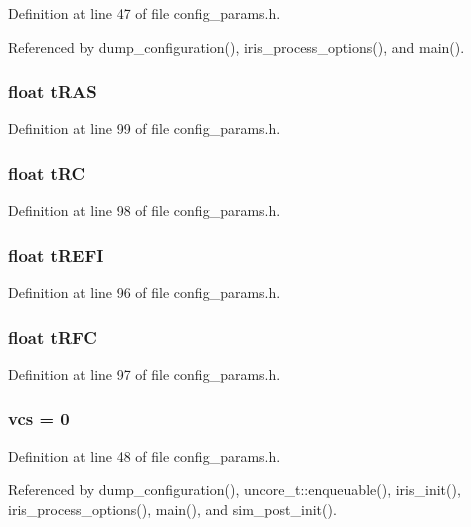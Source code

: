 Definition at line 47 of file config\_\-params.h.

Referenced by dump\_\-configuration(), iris\_\-process\_\-options(), and main().
\subsubsection[{tRAS}]{\setlength{\rightskip}{0pt plus 5cm}float {\bf tRAS}}\label{config__params_8h_aff3cd5f072642f33b34e22dc51e9210}




Definition at line 99 of file config\_\-params.h.
\subsubsection[{tRC}]{\setlength{\rightskip}{0pt plus 5cm}float {\bf tRC}}\label{config__params_8h_484732b54a34fb6027a9165e56755a7c}




Definition at line 98 of file config\_\-params.h.
\subsubsection[{tREFI}]{\setlength{\rightskip}{0pt plus 5cm}float {\bf tREFI}}\label{config__params_8h_abdac28cd7c2fdbdaf6dfba8f07c26d6}




Definition at line 96 of file config\_\-params.h.
\subsubsection[{tRFC}]{\setlength{\rightskip}{0pt plus 5cm}float {\bf tRFC}}\label{config__params_8h_e3d6088ef7cf719532282882b62a3afc}




Definition at line 97 of file config\_\-params.h.
\subsubsection[{vcs}]{ {\bf vcs} = 0}\label{config__params_8h_167bf7b9303ef9d8ccec13d71a10d6b5}




Definition at line 48 of file config\_\-params.h.

Referenced by dump\_\-configuration(), uncore\_\-t::enqueuable(), iris\_\-init(), iris\_\-process\_\-options(), main(), and sim\_\-post\_\-init().